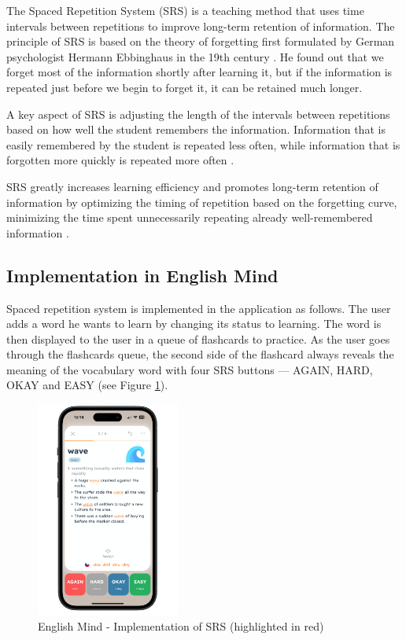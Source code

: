 The Spaced Repetition System (SRS) is a teaching method that uses time intervals between repetitions to improve long-term retention of information. The principle of SRS is based on the theory of forgetting first formulated by German psychologist Hermann Ebbinghaus in the 19th century \cite{cite:ebbinghaus2013_memory_contribution_to_experimantal_psychology}. He found out that we forget most of the information shortly after learning it, but if the information is repeated just before we begin to forget it, it can be retained much longer.

A key aspect of SRS is adjusting the length of the intervals between repetitions based on how well the student remembers the information. Information that is easily remembered by the student is repeated less often, while information that is forgotten more quickly is repeated more often \cite{cite:kang2016_spaced_repetiton_promotes_efficient_learning}.

SRS greatly increases learning efficiency and promotes long-term retention of information by optimizing the timing of repetition based on the forgetting curve, minimizing the time spent unnecessarily repeating already well-remembered information \cite{cite:kang2016_spaced_repetiton_promotes_efficient_learning}.

\subsection{Implementation in English Mind}

Spaced repetition system is implemented in the application as follows. The user adds a word he wants to learn by changing its status to learning. The word is then displayed to the user in a queue of flashcards to practice. As the user goes through the flashcards queue, the second side of the flashcard always reveals the meaning of the vocabulary word with four SRS buttons — AGAIN, HARD, OKAY and EASY (see Figure \ref{fig:em-srs-flashcard}).

\begin{figure}[!h]
    \includegraphics[width=0.42\textwidth]{chapters/images/em-srs-flashcard.png}
    \caption{English Mind - Implementation of SRS (highlighted in red)}
    \label{fig:em-srs-flashcard}
\end{figure}

